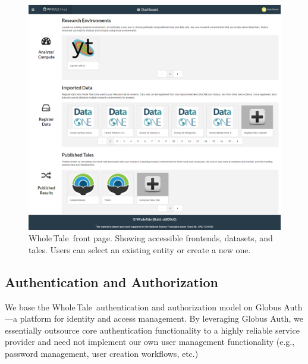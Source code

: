 \documentclass{elsarticle}
\newcommand{\wt}{Whole\,Tale}
\begin{document}


\begin{figure}[ht!]
\centering
  \includegraphics[trim=0in 0in 0in 0in,clip,width=0.75\columnwidth]{wt-webinterface.png}
\caption{\wt\ front page. Showing accessible frontends, datasets, and tales. Users can select an existing entity or create a new one. \label{fig:web}}
\end{figure}


\subsection{Authentication and Authorization}
We base the \wt\ authentication and authorization model on Globus Auth \cite{tuecke16auth}---a 
platform for identity and access management. 
By leveraging Globus Auth, we essentially outsource core authentication functionality
to a highly reliable service provider and need not implement
our own user management functionality (e.g., password management, user creation workflows, etc.)
\end{document}
